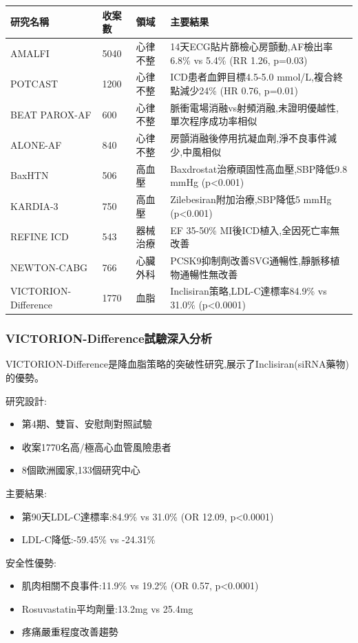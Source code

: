 \documentclass[12pt,a4paper]{article}
\begin{document}
\begin{longtable}{p{2.5cm}p{1.5cm}p{3cm}p{7cm}}
\toprule
\textbf{研究名稱} & \textbf{收案數} & \textbf{領域} & \textbf{主要結果} \\
\midrule
\endhead
AMALFI & 5040 & 心律不整 & 14天ECG貼片篩檢心房顫動,AF檢出率6.8\% vs 5.4\% (RR 1.26, p=0.03) \\
POTCAST & 1200 & 心律不整 & ICD患者血鉀目標4.5-5.0 mmol/L,複合終點減少24\% (HR 0.76, p=0.01) \\
BEAT PAROX-AF & 600 & 心律不整 & 脈衝電場消融vs射頻消融,未證明優越性,單次程序成功率相似 \\
ALONE-AF & 840 & 心律不整 & 房顫消融後停用抗凝血劑,淨不良事件減少,中風相似 \\
BaxHTN & 506 & 高血壓 & Baxdrostat治療頑固性高血壓,SBP降低9.8 mmHg (p<0.001) \\
KARDIA-3 & 750 & 高血壓 & Zilebesiran附加治療,SBP降低5 mmHg (p<0.001) \\
REFINE ICD & 543 & 器械治療 & EF 35-50\% MI後ICD植入,全因死亡率無改善 \\
NEWTON-CABG & 766 & 心臟外科 & PCSK9抑制劑改善SVG通暢性,靜脈移植物通暢性無改善 \\
VICTORION-Difference & 1770 & 血脂 & Inclisiran策略,LDL-C達標率84.9\% vs 31.0\% (p<0.0001) \\
\bottomrule
\end{longtable}

\subsubsection{VICTORION-Difference試驗深入分析}

VICTORION-Difference是降血脂策略的突破性研究,展示了Inclisiran(siRNA藥物)的優勢。

研究設計:
\begin{itemize}[nosep]
    \item 第4期、雙盲、安慰劑對照試驗
    \item 收案1770名高/極高心血管風險患者
    \item 8個歐洲國家,133個研究中心
\end{itemize}

主要結果:
\begin{itemize}[nosep]
    \item 第90天LDL-C達標率:84.9\% vs 31.0\% (OR 12.09, p<0.0001)
    \item LDL-C降低:-59.45\% vs -24.31\%
\end{itemize}

安全性優勢:
\begin{itemize}[nosep]
    \item 肌肉相關不良事件:11.9\% vs 19.2\% (OR 0.57, p<0.0001)
    \item Rosuvastatin平均劑量:13.2mg vs 25.4mg
    \item 疼痛嚴重程度改善趨勢
\end{itemize}
\end{document}
